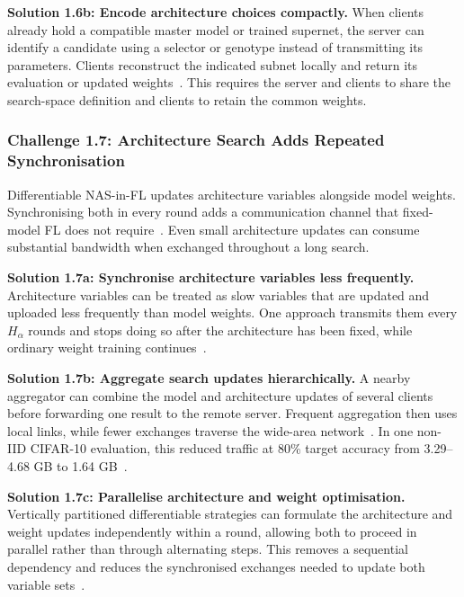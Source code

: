 \noindent\textbf{Solution 1.6b: Encode architecture choices compactly.} When clients already hold a compatible master model or trained supernet, the server can identify a candidate using a selector or genotype instead of transmitting its parameters. Clients reconstruct the indicated subnet locally and return its evaluation or updated weights~\cite{rt_fed_evo_nas_2020,medical_image_segmentation_fednas_2024,intrusion_detection_fednas_2024}. This requires the server and clients to share the search-space definition and clients to retain the common weights.

\subsubsection{Challenge 1.7: Architecture Search Adds Repeated Synchronisation}

Differentiable NAS-in-FL updates architecture variables alongside model weights. Synchronising both in every round adds a communication channel that fixed-model FL does not require~\cite{fednas_2021,fedregnas_2025}. Even small architecture updates can consume substantial bandwidth when exchanged throughout a long search.

\noindent\textbf{Solution 1.7a: Synchronise architecture variables less frequently.} Architecture variables can be treated as slow variables that are updated and uploaded less frequently than model weights. One approach transmits them every \(H_{\alpha}\) rounds and stops doing so after the architecture has been fixed, while ordinary weight training continues~\cite{fedregnas_2025}.

\noindent\textbf{Solution 1.7b: Aggregate search updates hierarchically.} A nearby aggregator can combine the model and architecture updates of several clients before forwarding one result to the remote server. Frequent aggregation then uses local links, while fewer exchanges traverse the wide-area network~\cite{finch_2024}. In one non-IID CIFAR-10 evaluation, this reduced traffic at 80\% target accuracy from 3.29--4.68 GB to 1.64 GB~\cite{finch_2024}.

\noindent\textbf{Solution 1.7c: Parallelise architecture and weight optimisation.} Vertically partitioned differentiable strategies can formulate the architecture and weight updates independently within a round, allowing both to proceed in parallel rather than through alternating steps. This removes a sequential dependency and reduces the synchronised exchanges needed to update both variable sets~\cite{self-supervised_vertical_fednas_2023}.

